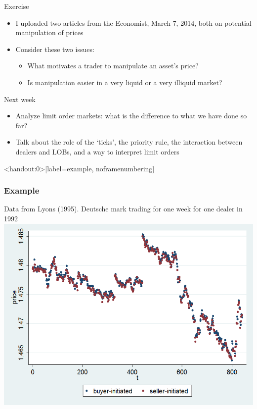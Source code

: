 \documentclass[english,10pt]{beamer}
\begin{document}
\begin{frame}{Exercise}
\begin{itemize}
	\item I uploaded two articles from the Economist, March 7, 2014, both on potential manipulation of prices
	\item Consider these two issues:
	\begin{itemize}
		\item What motivates a trader to manipulate an asset's price? 
		\item Is manipulation easier in a very liquid or a very illiquid market?
	\end{itemize}
\end{itemize}
\end{frame}


\begin{frame}{Next week}
\begin{itemize}
	\item Analyze limit order markets: what is the difference to what we have done so far?
	\item Talk about the role of the `ticks', the priority rule, the interaction between dealers and LOBs, and a way to interpret limit orders
\end{itemize}
\end{frame}


\begin{frame}<handout:0>[label=example, noframenumbering]
\frametitle{Example}
Data from Lyons (1995). Deutsche mark trading for one week for one dealer in 1992
\center
\includegraphics[scale=0.3]{pics/trading}
\end{frame}
\end{document}
